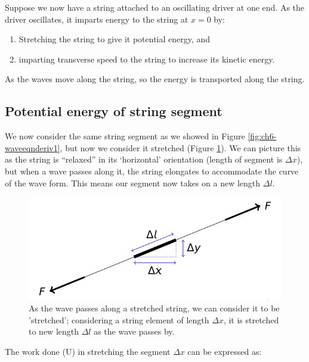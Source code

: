 \documentclass[
]{book}
\providecommand{\tightlist}{%
  \setlength{\itemsep}{0pt}\setlength{\parskip}{0pt}}
\begin{document}
Suppose we now have a string attached to an oscillating driver at one end. As the driver oscillates, it imparts energy to the string at \(x=0\) by:

\begin{enumerate}
\def\labelenumi{\arabic{enumi}.}
\tightlist
\item
  Stretching the string to give it potential energy, and
\item
  imparting transverse speed to the string to increase its kinetic energy.
\end{enumerate}

As the waves move along the string, so the energy is transported along the string.

\hypertarget{sec-ch7-peofstringsegment}{%
\subsection{Potential energy of string segment}\label{sec-ch7-peofstringsegment}}

We now consider the same string segment as we showed in Figure \ref{fig:ch6-waveeqnderiv1}, but now we consider it stretched (Figure \ref{fig:ch7-stretchedsegment1}). We can picture this as the string is ``relaxed'' in its `horizontal' orientation (length of segment is \(\Delta x\)), but when a wave passes along it, the string elongates to accommodate the curve of the wave form. This means our segment now takes on a new length \(\Delta l\).

\begin{figure}

{\centering \includegraphics[width=0.7\linewidth]{visualisations/LaTeX/ch7-peofstringsegment} 

}

\caption{As the wave passes along a stretched string, we can consider it to be 'stretched'; considering a string element of length $\Delta x$, it is stretched to new length $\Delta l$ as the wave passes by.}\label{fig:ch7-stretchedsegment1}
\end{figure}

The work done (\Delta U) in stretching the segment \(\Delta x\) can be expressed as:
\end{document}
